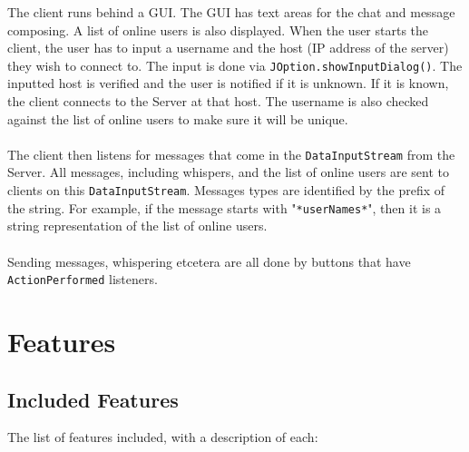 \documentclass[12pt]{article}
\begin{document}
The client runs behind a GUI. The GUI has text areas for the chat and message
composing. A list of online users is also displayed. When the user starts the
client, the user has to input a username and the host (IP
address of the server) they wish to connect to. The input is done via \texttt{JOption.showInputDialog()}.
The inputted host is verified and the user is notified if it is unknown. If it is known, the client
connects to the Server at that host. The username is also checked against the list of online users to
make sure it will be unique.
\\\\
The client then listens for messages that come in the \texttt{DataInputStream} from the Server.
All messages, including whispers, and the list of online users are sent to clients on
this \texttt{DataInputStream}. Messages types are identified by the prefix of the string. For
example, if the message starts with "\texttt{*userNames*}", then it is a string representation
of the list of online users.
\\\\
Sending messages, whispering etcetera are all done by buttons that have \texttt{ActionPerformed}
listeners.

\section{Features}

\subsection{Included Features}

The list of features included, with a description of each:
\end{document}
